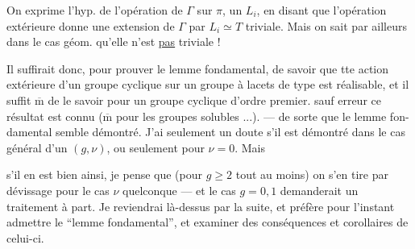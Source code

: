 On exprime l'hyp. de l'opération  de $\Gamma$ sur
$\pi$,   un $L_i$, en disant que
l'opération extérieure donne une extension
de $\Gamma$ par $L_i\simeq T$ triviale. Mais on sait
par ailleurs dans le cas géom.  qu'elle
n'est \uline{pas} triviale !

Il suffirait donc,  pour prouver le
lemme fondamental, de savoir que tte
action extérieure \inserted{[fidèle]} d'un groupe cyclique
sur un groupe à lacets de type 
est réalisable, et il suffit $\overline{\mathrm m}$ de le savoir
pour un groupe cyclique d'ordre
premier.   sauf erreur ce résultat
est  connu ($\overline{\mathrm m}$ pour les groupes 
solubles ...). --- de sorte que le lemme fon-
damental semble démontré. J'ai seulement
un doute s'il est démontré dans le
cas général d'un $(g,\nu)$,  ou seulement
pour  $\nu=0$. Mais 

 s'il en
est bien ainsi, je pense que (pour $g\geq2$ tout
au moins) on s'en tire par dévissage
pour le cas $\nu$ quelconque --- et le cas $g=0,1$
demanderait  un traitement à part.
Je reviendrai là-dessus par la suite, et
préfère pour l'instant admettre le ``lemme
fondamental'', et examiner des conséquences
et corollaires de celui-ci.

